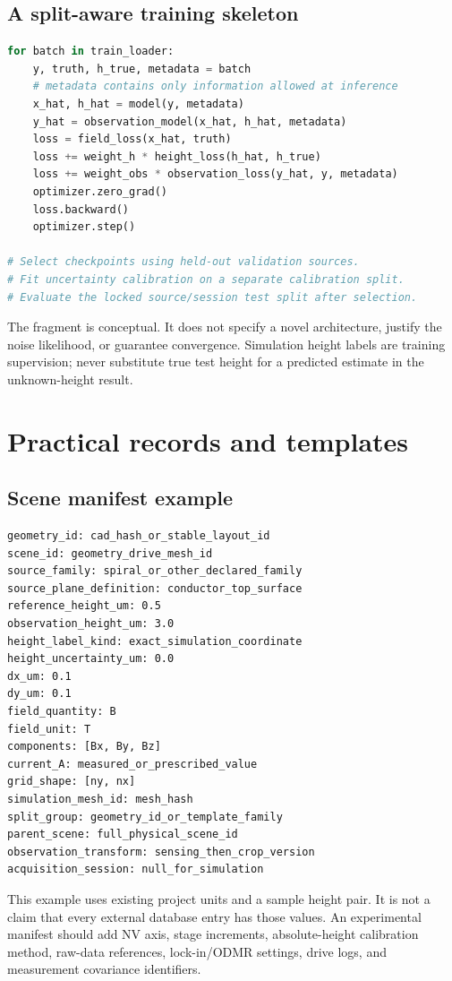 \subsection{A split-aware training skeleton}
\begin{lstlisting}[language=Python]
for batch in train_loader:
    y, truth, h_true, metadata = batch
    # metadata contains only information allowed at inference
    x_hat, h_hat = model(y, metadata)
    y_hat = observation_model(x_hat, h_hat, metadata)
    loss = field_loss(x_hat, truth)
    loss += weight_h * height_loss(h_hat, h_true)
    loss += weight_obs * observation_loss(y_hat, y, metadata)
    optimizer.zero_grad()
    loss.backward()
    optimizer.step()

# Select checkpoints using held-out validation sources.
# Fit uncertainty calibration on a separate calibration split.
# Evaluate the locked source/session test split after selection.
\end{lstlisting}
The fragment is conceptual. It does not specify a novel architecture, justify the noise likelihood, or guarantee convergence. Simulation height labels are training supervision; never substitute true test height for a predicted estimate in the unknown-height result.

\clearpage
\section{Practical records and templates}
\subsection{Scene manifest example}
\par\noindent\begin{minipage}{\linewidth}
\begin{lstlisting}
geometry_id: cad_hash_or_stable_layout_id
scene_id: geometry_drive_mesh_id
source_family: spiral_or_other_declared_family
source_plane_definition: conductor_top_surface
reference_height_um: 0.5
observation_height_um: 3.0
height_label_kind: exact_simulation_coordinate
height_uncertainty_um: 0.0
dx_um: 0.1
dy_um: 0.1
field_quantity: B
field_unit: T
components: [Bx, By, Bz]
current_A: measured_or_prescribed_value
grid_shape: [ny, nx]
simulation_mesh_id: mesh_hash
split_group: geometry_id_or_template_family
parent_scene: full_physical_scene_id
observation_transform: sensing_then_crop_version
acquisition_session: null_for_simulation
\end{lstlisting}
\end{minipage}\par
This example uses existing project units and a sample height pair. It is not a claim that every external database entry has those values. An experimental manifest should add NV axis, stage increments, absolute-height calibration method, raw-data references, lock-in/ODMR settings, drive logs, and measurement covariance identifiers.

